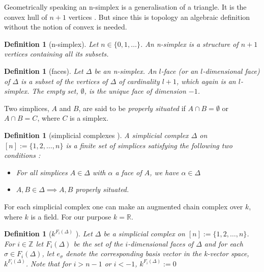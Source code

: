 \documentclass[11pt,a4paper,twoside]{report}
\newtheorem{mydef}[mythm]{Definition}
\begin{document}
Geometrically speaking an n-simplex is a generalisation of a triangle. It is the convex hull of $n+1$ vertices \cite{Nadathur}. But since this is topology an algebraic definition without the notion of convex is needed.

\begin{mydef}[n-simplex]
Let $n\in\{0,1,\dots\}$. An n-simplex is a structure of $n+1$ vertices containing all its subsets.
\end{mydef}

\begin{mydef}[faces]
Let $\Delta$ be an n-simplex. An $l$-face (or an $l$-dimensional face) of $\Delta$ is a subset of the vertices of $\Delta$ of cardinality $l+1$, which again is an $l$-simplex. \cite{Nadathur} The empty set, $\emptyset$, is the unique face of dimension $-1$.\cite{Allgaier}
\end{mydef}

Two simplices, $A$ and $B$, are said to be \textit{properly situated} if $A\cap B=\emptyset$ or $A\cap B = C$, where $C$ is a simplex.\cite{Nadathur}

\begin{mydef}[simplicial complexes \cite{Nadathur}]
A simplicial complex $\Delta$ on $[n] := \{1,2,\dots ,n\}$ is a finite set of simplices satisfying the following two conditions :
\begin{itemize}
\item For all simplices $A\in\Delta$ with $\alpha$ a face of $A$, we have $\alpha\in\Delta$
\item $A,B\in\Delta\implies A, B $ properly situated.
\end{itemize}
\end{mydef}

For each simplicial complex one can make an augmented chain complex over $k$, where $k$ is a field. For our purpose $k=\mathbb{R}$.

\begin{mydef}[$k^{F_i(\Delta)}$ \cite{Allgaier}]
Let $\Delta$ be a simplicial complex on $[n] := \{1,2,\dots ,n\}$. For $i\in \mathbb{Z}$ let $F_i(\Delta)$ be the set of the $i$-dimensional faces of $\Delta$ and for each $\sigma\in F_i(\Delta)$, let $e_{\sigma}$ denote the corresponding basis vector in the k-vector space, $k^{F_i(\Delta)}$. Note that for $i>n-1$ or $i<-1$, $k^{F_i(\Delta)}:=0$
\end{mydef}
\end{document}
